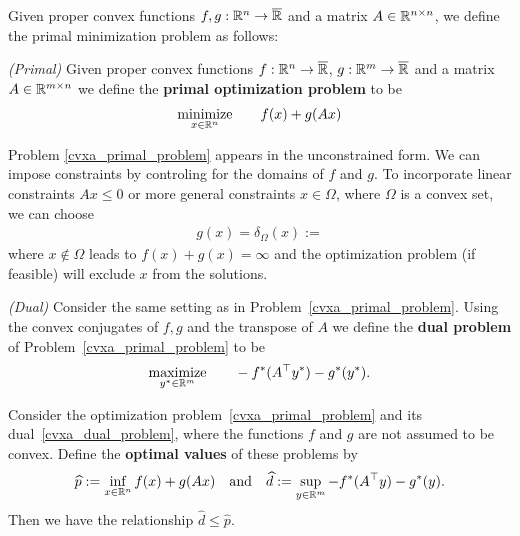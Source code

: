 Given 
proper convex functions $f, g : \mathbb{R}^n \to \overline{\mathbb{R}}$ 
and
a matrix $A \in \mathbb{R}^{n \times n}$,
we define 
the primal minimization problem as follows:
\begin{problem}
  \emph{(Primal)}
  Given proper convex functions 
  $
  f:\mathbb{R}^n \to \overline{\mathbb{R}} 
  $,
  $
  g:\mathbb{R}^m \to \overline{\mathbb{R}} 
  $
  and a matrix 
  $
    A\in \mathbb{R}^{m \times n}
  $
  we define the \textbf{primal optimization problem} to be
  \label{cvxa_primal_problem}
  \begin{gather*}
    \underset{x \in \mathbb{R}^n}{\mathrm{minimize}}
    \qquad
    f(x) + g(Ax)
  \end{gather*}
\end{problem}
\begin{remark}
  Problem \autoref{cvxa_primal_problem}
  appears in the unconstrained form. We can impose constraints by controling for the domains of $f$ and $g$.
  To incorporate linear constraints $Ax \le 0$
  or more general constraints $x\in\Omega$, where $\Omega$ is a convex set,
  we can choose
  \begin{gather}
    g(x)=\delta_\Omega(x):=
  \end{gather}
  where $x\notin\Omega$
  leads to 
  $f(x) + g(x)=\infty$
  and the optimization problem (if feasible) will exclude $x$ from the solutions.
\end{remark}
\begin{problem}
  \emph{(Dual)}
  \label{cvxa_dual_problem}
  Consider the same setting as in Problem~\autoref{cvxa_primal_problem}.
  Using the convex conjugates of $f,g$ and the transpose of $A$
  we define the \textbf{dual problem} of Problem~\autoref{cvxa_primal_problem} to be
  \begin{gather*}
    \underset{y^* \in \mathbb{R}^m}{\mathrm{maximize}}
    \qquad
   - f^*(A^\top y^*) - g^*(y^*).
  \end{gather*}
\end{problem}
\begin{proposition}
  Consider the optimization problem~\autoref{cvxa_primal_problem} and its dual~\autoref{cvxa_dual_problem}, where the functions $f$ and $g$ are not assumed to be convex. Define the \textbf{optimal values} of these problems by
  \begin{gather*}
    \widehat{p}:= \inf_{x\in\mathbb{R}^n}f(x)+g(Ax)
    \quad
    \text{and}
    \quad
    \widehat{d}:= \sup_{y\in\mathbb{R}^m} - f^*(A^\top y) - g^*(y).
  \end{gather*}
  Then we have the relationship
  $\widehat{d}\le \widehat{p}$.
\end{proposition}
